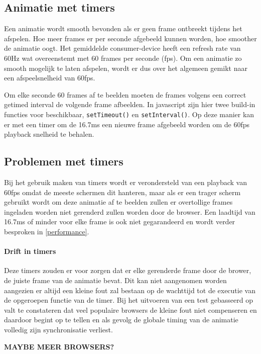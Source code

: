 \subsection{Animatie met timers}

Een animatie wordt smooth bevonden als er geen frame ontbreekt tijdens het afspelen. Hoe meer frames er per seconde afgebeeld kunnen worden, hoe smoother de animatie oogt. Het gemiddelde consumer-device heeft een refresh rate van 60Hz wat overeenstemt met 60 frames per seconde (fps). Om een animatie zo smooth mogelijk te laten afspelen, wordt er dus over het algemeen gemikt naar een afspeelsnelheid van 60fps.

Om elke seconde 60 frames af te beelden moeten de frames volgens een correct getimed interval de volgende frame afbeelden. In javascript zijn hier twee build-in functies voor beschikbaar, \texttt{setTimeout()} en \texttt{setInterval()}. Op deze manier kan er met een timer om de 16.7ms een nieuwe frame afgebeeld worden om de 60fps playback snelheid te behalen.

\subsection{Problemen met timers}
Bij het gebruik maken van timers wordt er verondersteld van een playback van 60fps omdat de meeste schermen dit hanteren, maar als er een trager scherm gebruikt wordt om deze animatie af te beelden zullen er overtollige frames ingeladen worden niet gerenderd zullen worden door de browser. Een laadtijd van 16.7ms of minder voor elke frame is ook niet gegarandeerd en wordt verder besproken in \ref{performance}.

\paragraph{Drift in timers}Deze timers zouden er voor zorgen dat er elke gerenderde frame door de brower, de juiste frame van de animatie bevat. Dit kan niet aangenomen worden aangezien er altijd een kleine fout zal bestaan op de wachttijd tot de executie van de opgeroepen functie van de timer. Bij het uitvoeren van een test gebasseerd op \cite{testDrift} valt te constateren dat veel populaire browsers de kleine fout niet compenseren en daardoor begint op te tellen en als gevolg de globale timing van de animatie volledig zijn synchronisatie verliest.

\textbf{MAYBE MEER BROWSERS?}


